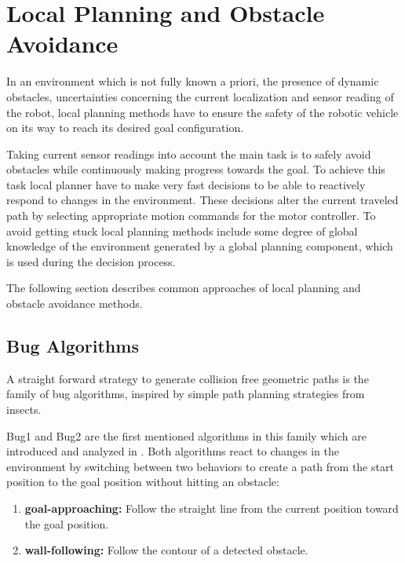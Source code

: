 \chapter{Local Planning and Obstacle Avoidance}\label{ch:local}
In an environment which is not fully known a priori, the presence of dynamic obstacles, uncertainties concerning the current localization and sensor reading of the robot, local planning methods have to ensure the safety of the robotic vehicle on its way to reach its desired goal configuration.

Taking current sensor readings into account the main task is to safely avoid obstacles while continuously making progress towards the goal.
To achieve this task local planner have to make very fast decisions to be able to reactively respond to changes in the environment. 
These decisions alter the current traveled path by selecting appropriate motion commands for the motor controller.
To avoid getting stuck local planning methods include some degree of global knowledge of the environment generated by a global planning component, which is used during the decision process.

The following section describes common approaches of local planning and obstacle avoidance methods. 

\section{Bug Algorithms}
A straight forward strategy to generate collision free geometric paths is the family of bug algorithms, inspired by simple path planning strategies from insects.   

Bug1 and Bug2 are the first mentioned algorithms in this family which are introduced and analyzed in \cite{lumelsky1987path}.
Both algorithms react to changes in the environment by switching between two behaviors to create a path from the start position to the goal position without hitting an obstacle:
\begin{enumerate}
\item {\bf goal-approaching:} Follow the straight line from the current position toward the goal position.
\item {\bf wall-following:} Follow the contour of a detected obstacle.
\end{enumerate}

